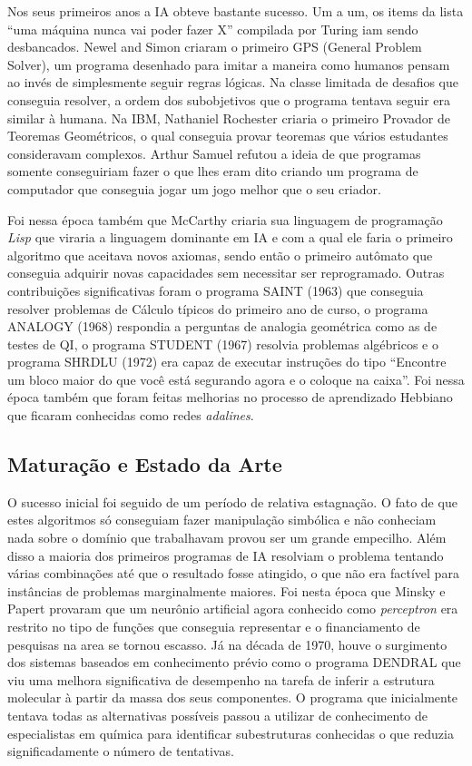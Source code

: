Nos seus primeiros anos a IA obteve bastante sucesso. Um a um, os items da
lista ``uma máquina nunca vai poder fazer X'' compilada por Turing iam sendo
desbancados. Newel and Simon criaram o primeiro GPS (General Problem Solver),
um programa desenhado para imitar a maneira como humanos pensam ao invés de
simplesmente seguir regras lógicas. Na classe limitada de desafios que
conseguia resolver, a ordem dos subobjetivos que o programa tentava seguir era
similar à humana. Na IBM, Nathaniel Rochester criaria o primeiro Provador de
Teoremas Geométricos, o qual conseguia provar teoremas que vários estudantes
consideravam complexos.  Arthur Samuel refutou a ideia de que programas somente
conseguiriam fazer o que lhes eram dito criando um programa de computador que
conseguia jogar um jogo melhor que o seu criador.

Foi nessa época também que McCarthy criaria sua linguagem de programação
\emph{Lisp} que viraria a linguagem dominante em IA e com a qual ele faria o
primeiro algoritmo que aceitava novos axiomas, sendo então o primeiro autômato
que conseguia adquirir novas capacidades sem necessitar ser reprogramado.
Outras contribuições significativas foram o programa SAINT (1963) que conseguia
resolver problemas de Cálculo típicos do primeiro ano de curso, o programa
ANALOGY (1968) respondia a perguntas de analogia geométrica como as de testes
de QI, o programa STUDENT (1967) resolvia problemas algébricos e o programa
SHRDLU (1972) era capaz de executar instruções do tipo ``Encontre um bloco
maior do que você está segurando agora e o coloque na caixa''. Foi nessa época
também que foram feitas melhorias no processo de aprendizado Hebbiano que
ficaram conhecidas como redes \emph{adalines}.

\subsection{Maturação e Estado da Arte}

O sucesso inicial foi seguido de um período de relativa estagnação. O fato de
que estes algoritmos só conseguiam fazer manipulação simbólica e não conheciam
nada sobre o domínio que trabalhavam provou ser um grande empecilho. Além disso
a maioria dos primeiros programas de IA resolviam o problema tentando várias
combinações até que o resultado fosse atingido, o que não era factível para
instâncias de problemas marginalmente maiores. Foi nesta época que Minsky e
Papert provaram que um neurônio artificial agora conhecido como
\emph{perceptron} era restrito no tipo de funções que conseguia representar e o
financiamento de pesquisas na area se tornou escasso. Já na década de 1970,
houve o surgimento dos sistemas baseados em conhecimento prévio como o programa
DENDRAL que viu uma melhora significativa de desempenho na tarefa de inferir a
estrutura molecular à partir da massa dos seus componentes. O programa que
inicialmente tentava todas as alternativas possíveis passou a utilizar de
conhecimento de especialistas em química para identificar subestruturas
conhecidas o que reduzia significadamente o número de tentativas.

